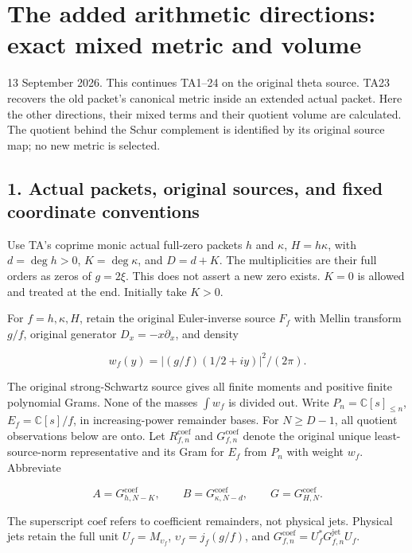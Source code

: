 \section{The added arithmetic directions: exact mixed metric and volume}\label{the-added-arithmetic-directions-exact-mixed-metric-and-volume}

13 September 2026. This continues TA1--24 on the original theta source.
TA23 recovers the old packet's canonical metric inside an extended actual
packet. Here the other directions, their mixed terms and their quotient
volume are calculated. The quotient behind the Schur complement is
identified by its original source map; no new metric is selected.

\subsection{1. Actual packets, original sources, and fixed coordinate conventions}\label{actual-packets-original-sources-and-fixed-coordinate-conventions}

Use TA's coprime monic actual full-zero packets \(h\) and \(\kappa\), \(H=h\kappa\),
with \(d=\deg h>0\), \(K=\deg\kappa\), and \(D=d+K\). The multiplicities are their
full orders as zeros of \(g=2\xi\). This does not assert a new zero exists.
\(K=0\) is allowed and treated at the end. Initially take \(K>0\).

For \(f=h,\kappa,H\), retain the original Euler-inverse source \(F_f\) with
Mellin transform \(g/f\), original generator \(D_x=-x\partial_x\), and density

\[
w_f(y)=|(g/f)(1/2+iy)|^2/(2\pi).
\]

The original strong-Schwartz source gives all finite moments and positive
finite polynomial Grams. None of the masses \(\int w_f\) is divided out.
Write \(P_n=\mathbb C[s]_{\le n}\), \(E_f=\mathbb C[s]/f\), in increasing-power remainder bases.
For \(N\ge D-1\), all quotient observations below are onto. Let \(R_{f,n}^{\mathrm{coef}}\)
and \(G_{f,n}^{\mathrm{coef}}\) denote the original unique least-source-norm representative
and its Gram for \(E_f\) from \(P_n\) with weight \(w_f\). Abbreviate

\[
A=G_{h,N-K}^{\mathrm{coef}},\qquad B=G_{\kappa,N-d}^{\mathrm{coef}},\qquad G=G_{H,N}^{\mathrm{coef}}.
\]

The superscript \(\mathrm{coef}\) refers to coefficient remainders, not physical jets.
Physical jets retain the full unit \(U_f=M_{\upsilon_f}\), \(\upsilon_f=j_f(g/f)\),
and \(G_{f,n}^{\mathrm{coef}}=U_f^*G_{f,n}^{\mathrm{jet}}U_f\).

